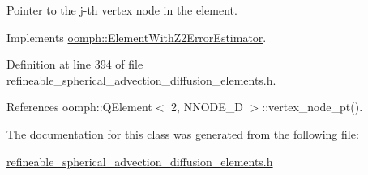 Pointer to the j-\/th vertex node in the element. 



Implements \hyperlink{classoomph_1_1ElementWithZ2ErrorEstimator_a0eedccc33519f852c5dc2055ddf2774b}{oomph\+::\+Element\+With\+Z2\+Error\+Estimator}.



Definition at line 394 of file refineable\+\_\+spherical\+\_\+advection\+\_\+diffusion\+\_\+elements.\+h.



References oomph\+::\+Q\+Element$<$ 2, N\+N\+O\+D\+E\+\_\+D $>$\+::vertex\+\_\+node\+\_\+pt().



The documentation for this class was generated from the following file\+:\begin{DoxyCompactItemize}
\item 
\hyperlink{refineable__spherical__advection__diffusion__elements_8h}{refineable\+\_\+spherical\+\_\+advection\+\_\+diffusion\+\_\+elements.\+h}\end{DoxyCompactItemize}
